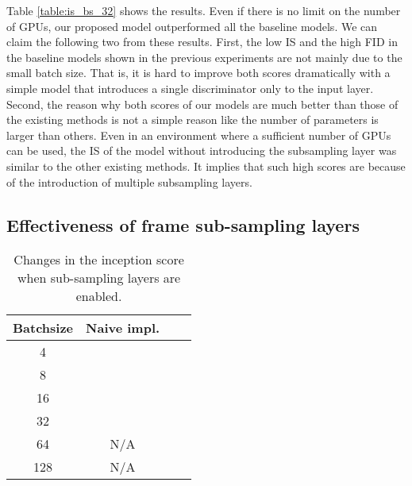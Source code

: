 \documentclass[twocolumn]{svjour3}
\def\Table#1{Table \ref{table:#1}}
\begin{document}
\Table{is_bs_32} shows the results. Even if there is no limit on the number of GPUs,
our proposed model outperformed all the baseline models.
We can claim the following two from these results.
First, the low IS and the high FID in the baseline models shown in the previous experiments
are not mainly due to the small batch size.
That is, it is hard to improve both scores dramatically
with a simple model that introduces a single discriminator only to the input layer.
Second, the reason why both scores of our models are much better than those of the existing methods
is not a simple reason like the number of parameters is larger than others.
Even in an environment where a sufficient number of GPUs can be used,
the IS of the model without introducing the subsampling layer was similar to the other existing methods.
It implies that such high scores are because of the introduction of multiple subsampling layers.
































\subsection{Effectiveness of frame sub-sampling layers}
\label{sec:frame_subsampling}












\begin{table}
\centering
{\renewcommand{\arraystretch}{1.2}
\begin{tabular}{c|ccc}
Batchsize & Naive impl. &  &  \\ \hline \hline
4 & {} & {} &  \\
8 & {} & {} &  \\
16 & {} & {} &  \\
32 & {} & {} &  \\
64 & N/A & {} &  \\
128 & N/A & {} & {} \\ \hline
\end{tabular}
}
\caption{Changes in the inception score when sub-sampling layers are enabled.}
\label{table:fr_is}
\end{table}
\end{document}
